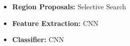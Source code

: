 \begin{frame}
	\begin{columns}
		\begin{overlayarea}{\textwidth}{\textheight}
			
		\end{overlayarea}
		\begin{overlayarea}{\textwidth}{\textheight}
			\begin{itemize}
				\justifying
				\item<1-> \textbf{Region Proposals:} Selective Search
				\item<2-> \textbf{Feature Extraction:} CNN
				\item<3-> \textbf{Classifier:} CNN
			\end{itemize}
		\end{overlayarea}
	\end{columns}
\end{frame}
